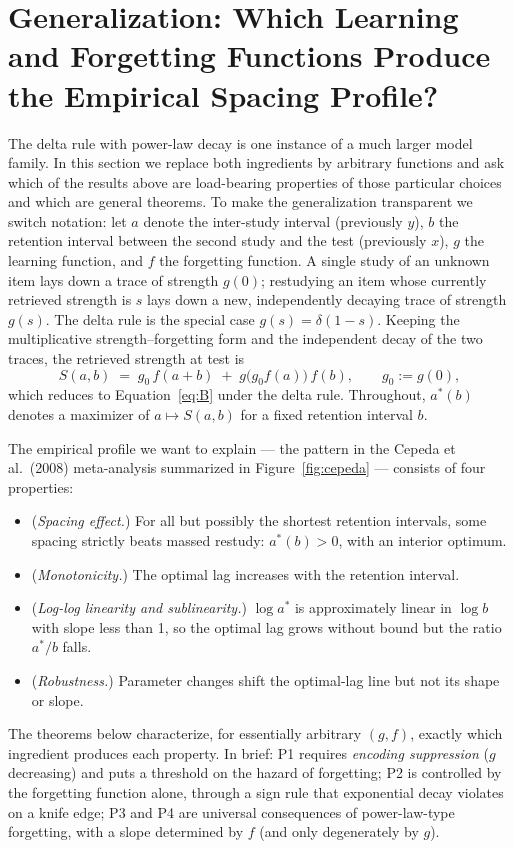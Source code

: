 \documentclass[man, 12pt, floatsintext]{apa6}
\theoremstyle{definition}
\theoremstyle{remark}
\begin{document}
\section{Generalization: Which Learning and Forgetting Functions Produce the Empirical Spacing Profile?}\label{sec:general}

The delta rule with power-law decay is one instance of a much larger model family. In this section we replace both ingredients by arbitrary functions and ask which of the results above are load-bearing properties of those particular choices and which are general theorems. To make the generalization transparent we switch notation: let $a$ denote the inter-study interval (previously $y$), $b$ the retention interval between the second study and the test (previously $x$), $g$ the learning function, and $f$ the forgetting function. A single study of an unknown item lays down a trace of strength $g(0)$; restudying an item whose currently retrieved strength is $s$ lays down a new, independently decaying trace of strength $g(s)$. The delta rule is the special case $g(s) = \delta(1-s)$. Keeping the multiplicative strength--forgetting form and the independent decay of the two traces, the retrieved strength at test is
\begin{equation}\label{eq:S}
  S(a,b) \;=\; g_0\, f(a+b) \;+\; g\!\big(g_0 f(a)\big)\, f(b), \qquad g_0 := g(0),
\end{equation}
which reduces to Equation~\ref{eq:B} under the delta rule. Throughout, $a^*(b)$ denotes a maximizer of $a \mapsto S(a,b)$ for a fixed retention interval $b$.

The empirical profile we want to explain --- the pattern in the Cepeda et al.\ (2008) meta-analysis summarized in Figure~\ref{fig:cepeda} --- consists of four properties:
\begin{itemize}
  \item[P1.] (\textit{Spacing effect.}) For all but possibly the shortest retention intervals, some spacing strictly beats massed restudy: $a^*(b) > 0$, with an interior optimum.
  \item[P2.] (\textit{Monotonicity.}) The optimal lag increases with the retention interval.
  \item[P3.] (\textit{Log-log linearity and sublinearity.}) $\log a^*$ is approximately linear in $\log b$ with slope less than 1, so the optimal lag grows without bound but the ratio $a^*/b$ falls.
  \item[P4.] (\textit{Robustness.}) Parameter changes shift the optimal-lag line but not its shape or slope.
\end{itemize}
The theorems below characterize, for essentially arbitrary $(g,f)$, exactly which ingredient produces each property. In brief: P1 requires \emph{encoding suppression} ($g$ decreasing) and puts a threshold on the hazard of forgetting; P2 is controlled by the forgetting function alone, through a sign rule that exponential decay violates on a knife edge; P3 and P4 are universal consequences of power-law-type forgetting, with a slope determined by $f$ (and only degenerately by $g$).
\end{document}

